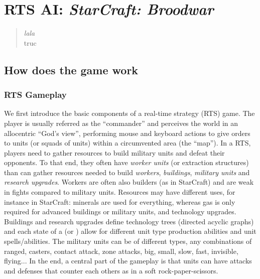 \chapter{RTS AI: \textit{StarCraft: Broodwar}}
\chaptertoc

\begin{quotation}\textit{
lala}
\\
truc
\end{quotation}

\section{How does the game work}

\subsection{RTS Gameplay}
We first introduce the basic components of a real-time strategy (RTS) game. The player is usually referred as the ``commander'' and perceives the world in an allocentric ``God's view'', performing mouse and keyboard actions to give orders to units (or squads of units) within a circumvented area (the ``map''). In a RTS, players need to gather resources to build military units and defeat their opponents. To that end, they often have \textit{worker units} (or extraction structures) than can gather resources needed to build \textit{workers}, \textit{buildings}, \textit{military units} and \textit{research upgrades}. Workers are often also builders (as in StarCraft) and are weak in fights compared to military units. Resources may have different uses, for instance in StarCraft: minerals are used for everything, whereas gas is only required for advanced buildings or military units, and technology upgrades. Buildings and research upgrades define technology trees (directed acyclic graphs) and each state of a 
 (or ) allow for different unit type production abilities and unit spells/abilities. The military units can be of different types, any combinations of ranged, casters, contact attack, zone attacks, big, small, slow, fast, invisible, flying... In the end, a central part of the gameplay is that units can have attacks and defenses that counter each others as in a soft rock-paper-scissors. 


